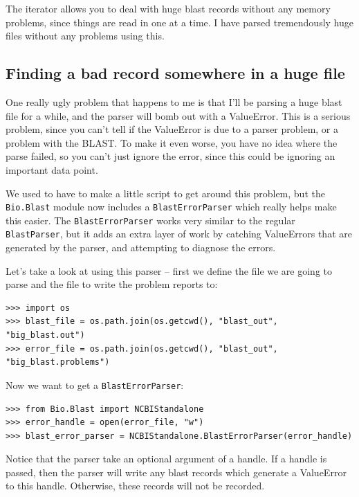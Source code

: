 \documentclass{report}
\begin{document}

The iterator allows you to deal with huge blast records without any memory problems, since things are read in one at a time. I have parsed tremendously huge files without any problems using this.

\subsection{Finding a bad record somewhere in a huge file}

One really ugly problem that happens to me is that I'll be parsing a huge blast file for a while, and the parser will bomb out with a ValueError. This is a serious problem, since you can't tell if the ValueError is due to a parser problem, or a problem with the BLAST. To make it even worse, you have no idea where the parse failed, so you can't just ignore the error, since this could be ignoring an important data point.

We used to have to make a little script to get around this problem, but the \verb|Bio.Blast| module now includes a \verb|BlastErrorParser| which really helps make this easier. The \verb|BlastErrorParser| works very similar to the regular \verb|BlastParser|, but it adds an extra layer of work by catching ValueErrors that are generated by the parser, and attempting to diagnose the errors.

Let's take a look at using this parser -- first we define the file we are going to parse and the file to write the problem reports to:

\begin{verbatim}
>>> import os
>>> blast_file = os.path.join(os.getcwd(), "blast_out", "big_blast.out")
>>> error_file = os.path.join(os.getcwd(), "blast_out", "big_blast.problems")
\end{verbatim}

Now we want to get a \verb|BlastErrorParser|:

\begin{verbatim}
>>> from Bio.Blast import NCBIStandalone
>>> error_handle = open(error_file, "w")
>>> blast_error_parser = NCBIStandalone.BlastErrorParser(error_handle)
\end{verbatim}

Notice that the parser take an optional argument of a handle. If a handle is passed, then the parser will write any blast records which generate a ValueError to this handle. Otherwise, these records will not be recorded.
\end{document}
